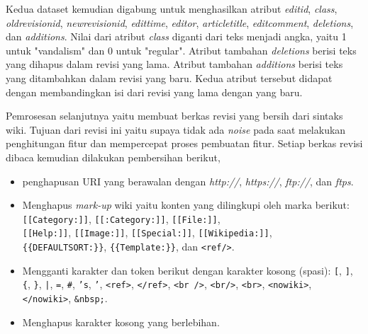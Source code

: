 Kedua dataset kemudian digabung untuk menghasilkan atribut \textit{editid},
\textit{class}, \textit{oldrevisionid}, \textit{newrevisionid},
\textit{edittime}, \textit{editor}, \textit{articletitle},
\textit{editcomment}, \textit{deletions}, dan \textit{additions}.
Nilai dari atribut \textit{class} diganti dari teks menjadi angka, yaitu 1
untuk "vandalism" dan 0 untuk "regular".
Atribut tambahan \textit{deletions} berisi teks yang dihapus dalam revisi yang
lama.
Atribut tambahan \textit{additions} berisi teks yang ditambahkan dalam revisi
yang baru.
Kedua atribut tersebut didapat dengan membandingkan isi dari revisi yang lama
dengan yang baru.

Pemrosesan selanjutnya yaitu membuat berkas revisi yang bersih dari sintaks
wiki.
Tujuan dari revisi ini yaitu supaya tidak ada \textit{noise} pada saat
melakukan penghitungan fitur dan mempercepat proses pembuatan fitur.
Setiap berkas revisi dibaca kemudian dilakukan pembersihan berikut,

\begin{itemize}
\item penghapusan URI yang berawalan dengan
\textit{http://}, \textit{https://}, \textit{ftp://}, dan \textit{ftps}.
\item Menghapus \textit{mark-up} wiki yaitu konten yang dilingkupi oleh marka
berikut:
\texttt{[[Category:]]}, \texttt{[[:Category:]]}, \texttt{[[File:]]}, \\
\texttt{[[Help:]]}, \texttt{[[Image:]]}, \texttt{[[Special:]]},
\texttt{[[Wikipedia:]]}, \\
\texttt{\{\{DEFAULTSORT:\}\}}, \texttt{\{\{Template:\}\}}, dan \texttt{<ref/>}.
\item Mengganti karakter dan token berikut dengan karakter kosong (spasi):
\texttt{[}, \texttt{]}, \texttt{\{}, \texttt{\}}, \texttt{|}, \texttt{=},
\texttt{\#}, \texttt{'s}, \texttt{'}, \texttt{<ref>}, \texttt{</ref>},
\texttt{<br />}, \texttt{<br/>}, \texttt{<br>}, \texttt{<nowiki>},
\texttt{</nowiki>}, \texttt{\&nbsp;}.
\item Menghapus karakter kosong yang berlebihan.
\end{itemize}

